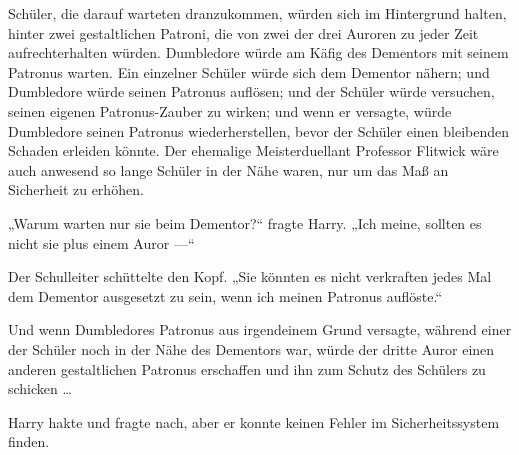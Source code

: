 Schüler, die darauf warteten dranzukommen, würden sich im Hintergrund halten, hinter zwei gestaltlichen Patroni, die von zwei der drei Auroren zu jeder Zeit aufrechterhalten würden. Dumbledore würde am Käfig des Dementors mit seinem Patronus warten. Ein einzelner Schüler würde sich dem Dementor nähern; und Dumbledore würde seinen Patronus auflösen; und der Schüler würde versuchen, seinen eigenen Patronus-Zauber zu wirken; und wenn er versagte, würde Dumbledore seinen Patronus wiederherstellen, bevor der Schüler einen bleibenden Schaden erleiden könnte. Der ehemalige Meisterduellant Professor Flitwick wäre auch anwesend so lange Schüler in der Nähe waren, nur um das Maß an Sicherheit zu erhöhen.

„Warum warten nur sie beim Dementor?“ fragte Harry.
„Ich meine, sollten es nicht sie plus einem Auror —“

Der Schulleiter schüttelte den Kopf.
„Sie könnten es nicht verkraften jedes Mal dem Dementor ausgesetzt zu sein, wenn ich meinen Patronus auflöste.“

Und wenn Dumbledores Patronus aus irgendeinem Grund versagte, während einer der Schüler noch in der Nähe des Dementors war, würde der dritte Auror einen anderen gestaltlichen Patronus erschaffen und ihn zum Schutz des Schülers zu schicken …

Harry hakte und fragte nach, aber er konnte keinen Fehler im Sicherheitssystem finden.


